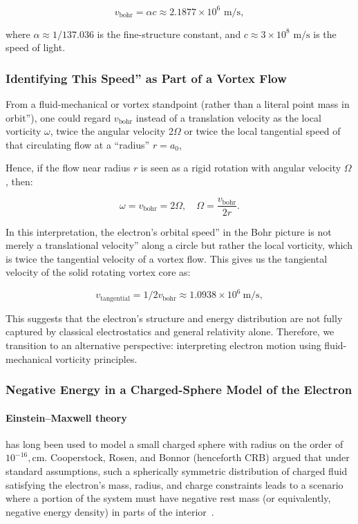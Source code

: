 \begin{equation*}
    v_\text{bohr} = \alpha c \approx 2.1877 \times 10^6 \text{ m/s},\label{eq:tangential-velocity}
\end{equation*}

where $\alpha \approx 1/137.036$ is the fine-structure constant, and $c \approx 3 \times 10^8 \text{ m/s}$ is the speed of light.

\subsubsection*{Identifying This Speed'' as Part of a Vortex Flow}
From a fluid-mechanical or vortex standpoint (rather than a literal point mass in orbit''), one could regard $v_\text{bohr}$ instead of a translation velocity as the local vorticity $\omega$, twice the angular velocity 2$\Omega$ or twice the local tangential speed of that circulating flow at a ``radius'' $r = a_0$,

Hence, if the flow near radius $r$ is seen as a rigid rotation with angular velocity $\Omega$, then:

\begin{equation*}
    \omega = v_\text{bohr} = 2\Omega, \quad  \Omega = \frac{v_\text{bohr}}{2 r}.\label{eq:angular-velocity}
\end{equation*}

In this interpretation, the electron’s orbital speed'' in the Bohr picture is not merely a translational velocity'' along a circle but rather the local vorticity, which is twice the tangential velocity of a vortex flow. This gives us the tangiental velocity of the solid rotating vortex core as:

\begin{equation*}
    v_{\text{tangential}} = 1/2 v_\text{bohr}  \approx 1.0938 \times 10^6 \ \text{m/s},
\end{equation*}

This suggests that the electron's structure and energy distribution are not fully captured by classical electrostatics and general relativity alone. Therefore, we transition to an alternative perspective: interpreting electron motion using fluid-mechanical vorticity principles.

\subsubsection*{Negative Energy in a Charged-Sphere Model of the Electron}

\paragraph{Einstein--Maxwell theory} has long been used to model a small charged sphere with radius on the order of $10^{-16},\mathrm{cm}$. Cooperstock, Rosen, and Bonnor (henceforth CRB) argued that under standard assumptions, such a spherically symmetric distribution of charged fluid satisfying the electron's mass, radius, and charge constraints leads to a scenario where a portion of the system must have negative rest mass (or equivalently, negative energy density) in parts of the interior~\cite{CRB1970}.

